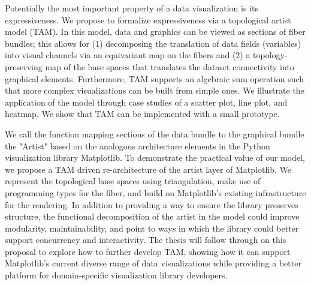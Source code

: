 Potentially the most important property of a data visualization is its expressiveness.  We propose to formalize expressiveness via a topological artist model (TAM). In this model, data and graphics can be viewed as sections of fiber bundles; this allows for (1) decomposing the translation of data fields (variables) into visual channels via an equivariant map on the fibers and (2) a topology-preserving map of the base spaces that translates the dataset connectivity into graphical elements. Furthermore, TAM supports an algebraic sum operation such that more complex visualizations can be built from simple ones. We illustrate the application of the model through case studies of a scatter plot, line plot, and heatmap. We show that TAM can be implemented with a small prototype.

We call the function mapping sections of the data bundle to the graphical bundle the "Artist" based on the analogous architecture elements in the Python visualization library Matplotlib. To demonstrate the practical value of our model, we propose a TAM driven re-architecture of the artist layer of Matplotlib. We represent the topological base spaces using triangulation, make use of programming types for the fiber, and build on Matplotlib's existing infrastructure for the rendering. In addition to providing a way to ensure the library preserves structure, the functional decomposition of the artist in the model could improve modularity, maintainability, and point to ways in which the library could better support concurrency and interactivity. The thesis will follow through on this proposal to explore how to further develop TAM, showing how it can support Matplotlib's current diverse range of data visualizations while providing a better platform for domain-specific visualization library developers.
